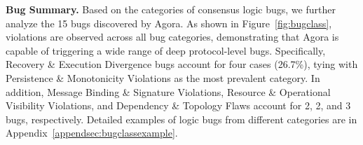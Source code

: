 \documentclass{article}
\theoremstyle{plain}
\theoremstyle{definition}
\theoremstyle{remark}
\newcommand{\consensustester}{Agora\xspace}
\begin{document}










\textbf{Bug Summary.}
Based on the categories of consensus logic bugs, we further analyze the 15 bugs discovered by \consensustester. As shown in Figure~\ref{fig:bugclass}, violations are observed across all bug categories, demonstrating that \consensustester is capable of triggering a wide range of deep protocol-level bugs.
Specifically, Recovery \& Execution Divergence bugs account for four cases (26.7\%), tying with Persistence \& Monotonicity Violations as the most prevalent category. In addition, Message Binding \& Signature Violations, Resource \& Operational Visibility Violations, and Dependency \& Topology Flaws account for 2, 2, and 3 bugs, respectively. Detailed examples of logic bugs from different categories are in Appendix~\ref{appendsec:bugclassexample}.






\end{document}
